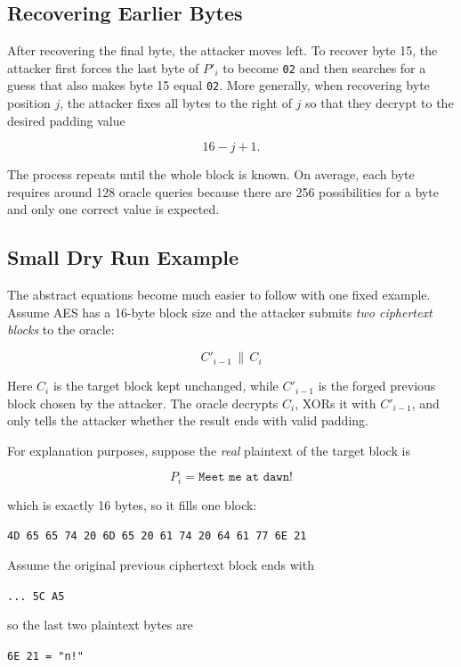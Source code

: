 \subsection{Recovering Earlier Bytes}

After recovering the final byte, the attacker moves left. To recover byte 15, the attacker first forces the last byte of $P'_i$ to become \texttt{02} and then searches for a guess that also makes byte 15 equal \texttt{02}. More generally, when recovering byte position $j$, the attacker fixes all bytes to the right of $j$ so that they decrypt to the desired padding value

\[
16 - j + 1.
\]

The process repeats until the whole block is known. On average, each byte requires around 128 oracle queries because there are 256 possibilities for a byte and only one correct value is expected.

\subsection{Small Dry Run Example}

The abstract equations become much easier to follow with one fixed example. Assume AES has a 16-byte block size and the attacker submits \emph{two ciphertext blocks} to the oracle:

\[
C'_{i-1} \,\|\, C_i
\]

Here $C_i$ is the target block kept unchanged, while $C'_{i-1}$ is the forged previous block chosen by the attacker. The oracle decrypts $C_i$, XORs it with $C'_{i-1}$, and only tells the attacker whether the result ends with valid padding.

For explanation purposes, suppose the \emph{real} plaintext of the target block is

\[
P_i = \texttt{Meet me at dawn!}
\]

which is exactly 16 bytes, so it fills one block:

\begin{center}
\texttt{4D 65 65 74 20 6D 65 20 61 74 20 64 61 77 6E 21}
\end{center}

Assume the original previous ciphertext block ends with

\begin{center}
\texttt{... 5C A5}
\end{center}

so the last two plaintext bytes are

\begin{center}
\texttt{6E 21 = "n!"}
\end{center}


